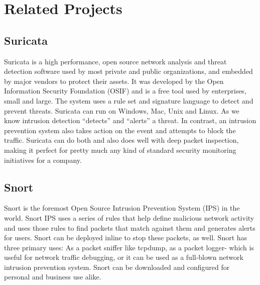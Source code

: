 \section{Related Projects}
\vspace{-18pt}
\subsection{Suricata}
\vspace{-18pt}
Suricata is a high performance, open source network analysis and threat detection software used by most private and public organizations, and embedded by major vendors to protect their assets. It was developed by the Open Information Security Foundation (OSIF) and is a free tool used by enterprises, small and large. The system uses a rule set and signature language to detect and prevent threats. Suricata can run on Windows, Mac, Unix and Linux. As we know intrusion detection “detects” and “alerts” a threat. In contrast, an intrusion prevention system also takes action on the event and attempts to block the traffic. Suricata can do both and also does well with deep packet inspection, making it perfect for pretty much any kind of standard security monitoring initiatives for a company.
 \vspace{-10pt}
\subsection{Snort}
\vspace{-18pt}
Snort is the foremost Open Source Intrusion Prevention System (IPS) in the world. Snort IPS uses a series of rules that help define malicious network activity and uses those rules to find packets that match against them and generates alerts for users. Snort can be deployed inline to stop these packets, as well. Snort has three primary uses: As a packet sniffer like tcpdump, as a packet logger- which is useful for network traffic debugging, or it can be used as a full-blown network intrusion prevention system. Snort can be downloaded and configured for personal and business use alike.
\vspace{-10pt}
